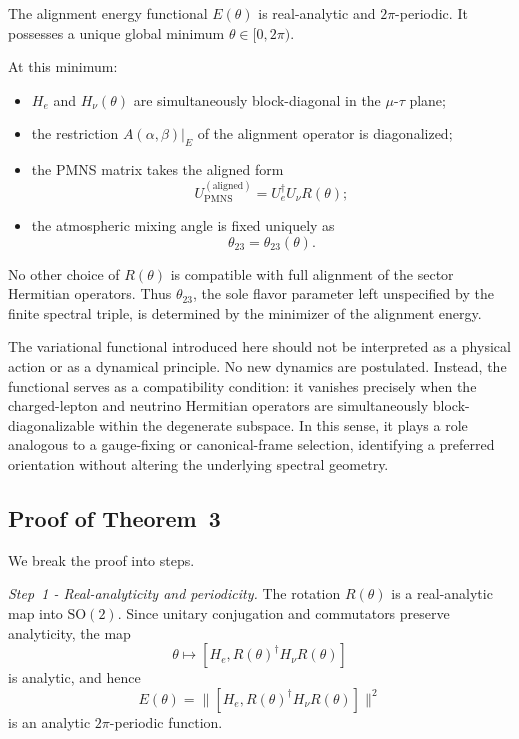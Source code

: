 \begin{theorem}
The alignment energy functional $E(\theta)$ is real-analytic and $2\pi$-periodic. It possesses a unique global minimum $\theta\in[0,2\pi)$.

At this minimum:
\begin{itemize}
\item $H_e$ and $H_\nu(\theta)$ are simultaneously block-diagonal in the $\mu$-$\tau$ plane;
\item the restriction $A(\alpha,\beta)|_E$ of the alignment operator is diagonalized;
\item the PMNS matrix takes the aligned form
\[
U_{\mathrm{PMNS}}^{(\mathrm{aligned})}
= U_e^\dagger U_\nu R(\theta);
\]
\item the atmospheric mixing angle is fixed uniquely as
\[
\theta_{23}=\theta_{23}(\theta).
\]
\end{itemize}

No other choice of $R(\theta)$ is compatible with full alignment of the sector Hermitian operators. Thus $\theta_{23}$, the sole flavor parameter left unspecified by the finite spectral triple, is determined by the minimizer of the alignment energy.
\end{theorem}

The variational functional introduced here should not be interpreted as a physical action or as a dynamical principle. No new dynamics are postulated. Instead, the functional serves as a compatibility condition: it vanishes precisely when the charged-lepton and neutrino Hermitian operators are simultaneously block-diagonalizable within the degenerate subspace. In this sense, it plays a role analogous to a gauge-fixing or canonical-frame selection, identifying a preferred orientation without altering the underlying spectral geometry.

\subsection[Proof of Theorem 3]{Proof of Theorem~3}

We break the proof into steps.

\emph{Step~1 - Real-analyticity and periodicity.}
The rotation $R(\theta)$ is a real-analytic map into $\mathrm{SO}(2)$. Since unitary conjugation and commutators preserve analyticity, the map
\[
\theta \longmapsto [H_e, R(\theta)^\dagger H_\nu R(\theta)]
\]
is analytic, and hence
\[
E(\theta)=\big\| [H_e, R(\theta)^\dagger H_\nu R(\theta)] \big\|^2
\]
is an analytic $2\pi$-periodic function.

